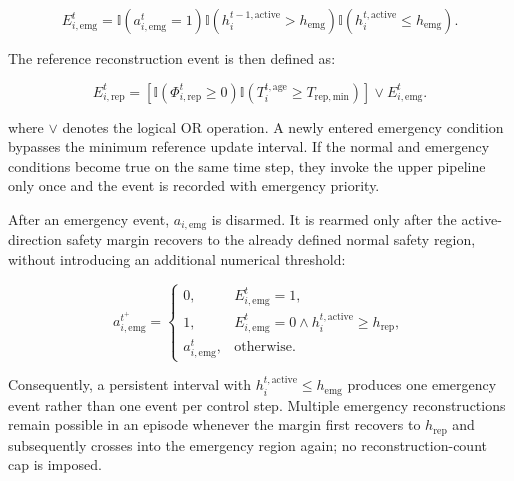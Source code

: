 \begin{equation}
    \label{eq:edge_emergency_event}
    E_{i,\mathrm{emg}}^t
    =
    \mathbb I\!\left(a_{i,\mathrm{emg}}^t=1\right)
    \mathbb I\!\left(h_i^{t-1,\mathrm{active}}>h_{\mathrm{emg}}\right)
    \mathbb I\!\left(h_i^{t,\mathrm{active}}\leq h_{\mathrm{emg}}\right).
\end{equation}

The reference reconstruction event is then defined as:

\begin{equation}
    \label{eq:final_reproposal_event}
    E_{i,\mathrm{rep}}^t
    =
    \left[
    \mathbb I
    \left(
    \Phi_{i,\mathrm{rep}}^t \geq 0
    \right)
    \mathbb I
    \left(
    T_i^{t,\mathrm{age}} \geq T_{\mathrm{rep,min}}
    \right)
    \right]
    \vee
    E_{i,\mathrm{emg}}^t.
\end{equation}

\noindent
where $\vee$ denotes the logical OR operation. A newly entered emergency condition bypasses the minimum reference update interval. If the normal and emergency conditions become true on the same time step, they invoke the upper pipeline only once and the event is recorded with emergency priority.

After an emergency event, $a_{i,\mathrm{emg}}$ is disarmed. It is rearmed only after the active-direction safety margin recovers to the already defined normal safety region, without introducing an additional numerical threshold:

\begin{equation}
    \label{eq:edge_emergency_rearm}
    a_{i,\mathrm{emg}}^{t^{+}}
    =
    \begin{cases}
        0, & E_{i,\mathrm{emg}}^t=1,\\[1mm]
        1, & E_{i,\mathrm{emg}}^t=0
             \land h_i^{t,\mathrm{active}}\geq h_{\mathrm{rep}},\\[1mm]
        a_{i,\mathrm{emg}}^t, & \mathrm{otherwise}.
    \end{cases}
\end{equation}

Consequently, a persistent interval with $h_i^{t,\mathrm{active}}\leq h_{\mathrm{emg}}$ produces one emergency event rather than one event per control step. Multiple emergency reconstructions remain possible in an episode whenever the margin first recovers to $h_{\mathrm{rep}}$ and subsequently crosses into the emergency region again; no reconstruction-count cap is imposed.

